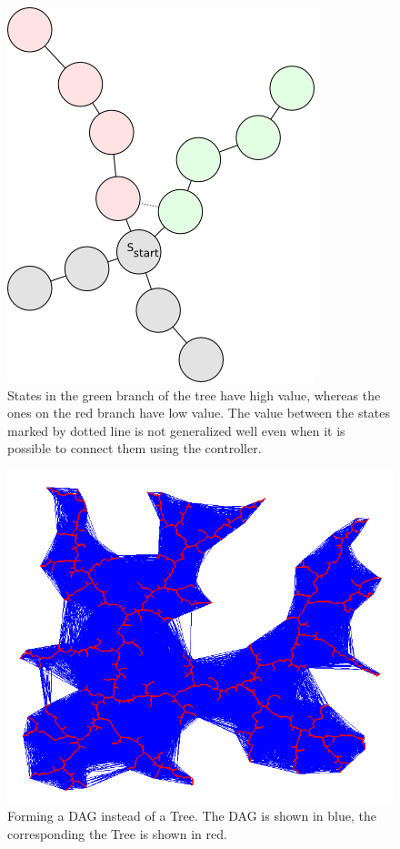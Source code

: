 \documentclass[wcp]{jmlr}
\begin{document}
\begin{itemize}
\begin{figure}[htb]
\centering
\label{fig:case}
\includegraphics[scale=0.45]{case.png}
\caption{States in the green branch of the tree have high value, whereas the ones on the red branch have low value. The value between the states marked by dotted line is not generalized well even when it is possible to connect them using the controller. }
\end{figure}

\begin{figure}[htb]
\centering
\label{fig:rrg}
\includegraphics[scale=0.45]{rrg.png}
\caption{Forming a DAG instead of a Tree. The DAG is shown in blue, the corresponding the Tree is shown in red.}
\end{figure}



\end{itemize}
\end{document}
